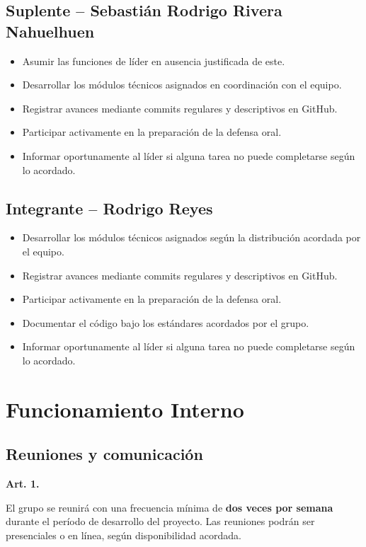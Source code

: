 \documentclass[12pt,a4paper]{article}
\newenvironment{articulo}[1]{%
  \begin{mdframed}[backgroundcolor=grisClaro,linecolor=azulUCT,linewidth=1.5pt,
    leftmargin=0pt,rightmargin=0pt,innerleftmargin=12pt,innerrightmargin=12pt,
    innertopmargin=8pt,innerbottommargin=8pt,roundcorner=4pt]
  \textbf{\textcolor{azulUCT}{Art. #1.}}\ %
}{\end{mdframed}\vspace{4pt}}
\begin{document}
\subsection{Suplente -- Sebastián Rodrigo Rivera Nahuelhuen}

\begin{itemize}[leftmargin=1.5em, itemsep=3pt]
  \item Asumir las funciones de líder en ausencia justificada de este.
  \item Desarrollar los módulos técnicos asignados en coordinación con el equipo.
  \item Registrar avances mediante commits regulares y descriptivos en GitHub.
  \item Participar activamente en la preparación de la defensa oral.
  \item Informar oportunamente al líder si alguna tarea no puede completarse según lo acordado.
\end{itemize}

\subsection{Integrante -- Rodrigo Reyes}

\begin{itemize}[leftmargin=1.5em, itemsep=3pt]
  \item Desarrollar los módulos técnicos asignados según la distribución acordada por el equipo.
  \item Registrar avances mediante commits regulares y descriptivos en GitHub.
  \item Participar activamente en la preparación de la defensa oral.
  \item Documentar el código bajo los estándares acordados por el grupo.
  \item Informar oportunamente al líder si alguna tarea no puede completarse según lo acordado.
\end{itemize}

\section{Funcionamiento Interno}

\subsection{Reuniones y comunicación}

\begin{articulo}{1}
El grupo se reunirá con una frecuencia mínima de \textbf{dos veces por semana} durante el período de desarrollo del proyecto. Las reuniones podrán ser presenciales o en línea, según disponibilidad acordada.
\end{articulo}
\end{document}
